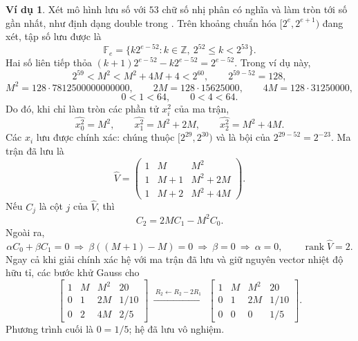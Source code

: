 \documentclass[12pt,a4paper,oneside]{book}
\numberwithin{algorithm}{chapter}
\theoremstyle{definition}
\newtheorem{vidu}{Ví dụ}[chapter]
\begin{document}
\begin{vidu}
Xét mô hình lưu số với $53$ chữ số nhị phân có nghĩa và làm tròn tới số gần nhất, như định dạng double trong \cite{oracle-754}. Trên khoảng chuẩn hóa $[2^e,2^{e+1})$ đang xét, tập số lưu được là
\[
 \mathbb F_e=\{k2^{e-52}:k\in\mathbb Z,\ 2^{52}\leq k<2^{53}\}.
\]
Hai số liên tiếp thỏa $(k+1)2^{e-52}-k2^{e-52}=2^{e-52}$. Trong ví dụ này,
\[
 2^{59}<M^2<M^2+4M+4<2^{60},\qquad 2^{59-52}=128,
\]
\[
 M^2=128\cdot7812500000000000,
 \qquad 2M=128\cdot15625000,
 \qquad 4M=128\cdot31250000,
\]
\[
 0<1<64,\qquad0<4<64.
\]
Do đó, khi chỉ làm tròn các phần tử $x_i^2$ của ma trận,
\[
 \widehat{x_0^2}=M^2,\qquad
 \widehat{x_1^2}=M^2+2M,\qquad
 \widehat{x_2^2}=M^2+4M.
\]
Các $x_i$ lưu được chính xác: chúng thuộc $[2^{29},2^{30})$ và là bội của $2^{29-52}=2^{-23}$. Ma trận đã lưu là
\[
 \widehat V=
 \begin{pmatrix}
 1&M&M^2\\
 1&M+1&M^2+2M\\
 1&M+2&M^2+4M
 \end{pmatrix}.
\]
Nếu $C_j$ là cột $j$ của $\widehat V$, thì
\[
 C_2=2MC_1-M^2C_0.
\]
Ngoài ra,
\[
 \alpha C_0+\beta C_1=0
 \ \Longrightarrow\ \beta((M+1)-M)=0
 \ \Longrightarrow\ \beta=0
 \ \Longrightarrow\ \alpha=0,
 \qquad\operatorname{rank}\widehat V=2.
\]
Ngay cả khi giải chính xác hệ với ma trận đã lưu và giữ nguyên vector nhiệt độ hữu tỉ, các bước khử Gauss cho
\[
 \left[
 \begin{array}{ccc|c}
 1&M&M^2&20\\
 0&1&2M&1/10\\
 0&2&4M&2/5
 \end{array}\right]
 \ \xrightarrow{\ R_2\gets R_2-2R_1\ }\
 \left[
 \begin{array}{ccc|c}
 1&M&M^2&20\\
 0&1&2M&1/10\\
 0&0&0&1/5
 \end{array}\right].
\]
Phương trình cuối là $0=1/5$; hệ đã lưu vô nghiệm.


\end{vidu}
\end{document}
